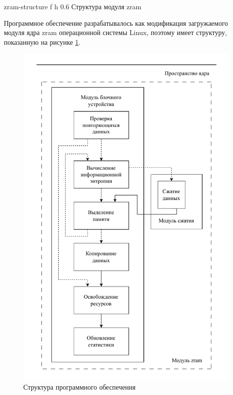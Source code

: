     {zram-structure}
    {f}
    {h}
    {0.6\textwidth}
    {Структура модуля zram}

Программное обеспечение разрабатывалось как модификация загружаемого модуля ядра zram операционной системы Linux, поэтому имеет структуру, показанную на рисунке \ref{img:structure}.

\begin{figure}[H]
	\begin{center}
		\includegraphics[scale=0.7]{inc/img/structure.pdf}
	\end{center}
	\captionsetup{justification=centering}
	\caption{Структура программного обеспечения}
	\label{img:structure}
\end{figure}

